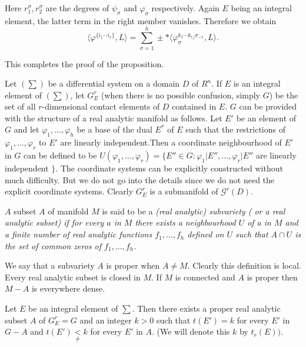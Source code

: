 Here $r^\sigma_1,  r^\sigma_2$ are the degrees of $\psi_\sigma$ and
$\varphi_\sigma$ respectively. Again $E$ being an integral element,  the
latter term in the right member vanishes. Therefore we obtain 
$$
\langle \varphi^{ \{i_1 \cdots i_r \}} ,  L \rangle = \sum^h_{\sigma =
  1} \pm * \langle \varphi_\sigma^{k_1 \cdots k_{r_2}\sigma_{-1}} ,  L
\rangle. 
$$

This completes the proof of the proposition.

Let $(\sum)$ be a differential system on a domain $D$ of $R^n$. If $E$
is an integral element of $(\sum)$,  let $G^r_E$ (when there is no
possible confusion,  simply $G$) be the set of all $r$-dimensional
contact elements of $D$ contained in $E$. $G$ can be provided with the
structure of a real analytic manifold as follows. Let $E'$ be an
element of $G$ and let $\varphi_1 ,  \ldots ,  \varphi_h$ be a base of
the dual $E^*$ of $E$ such that the restrictions of $\varphi_1 ,
\ldots ,  \varphi_r$ to $E'$ are linearly independent.\pageoriginale Then a
coordinate neighbourhood of $E'$ in $G$ can be defined to be $U
(\varphi_1 ,  \ldots ,  \varphi_r) = \{E'' \in G : \varphi_1 \big |
E'' ,  \ldots ,  \varphi_r \big | E'' $ are linearly independent $\}$.
The coordinate systems can be explicitly constructed without much
difficulty. But we do not go into the details since we do not need the
explicit coordinate systems. Clearly $G^r_E$ is a submanifold of
$\mathscr{G}^r (D)$. 

\begin{defi*} %
  $A$ subset $A$ of manifold $M$ is said to be a \em{ (real analytic)
    subvariety} ( or a \em {real analytic subset}) if for every $a$ in
  $M$ there exists a neighbourhood $U$ of a in $M$ and a finite number
  of real analytic functions $f_1 ,  \ldots ,  f_h$ defined on $U$
  such that $A \cap U$ is the set of common zeros of $f_1 ,  \ldots ,
  f_h$. 
\end{defi*}

We say that a subvariety $A$ is proper when $A \neq M$. Clearly this
definition is local. Every real analytic subset is closed in $M$. If
$M$ is connected and $A$ is proper then $M - A$ is everywhere dense. 

\begin{proposition}\label{chap2:sec2.3:prop6} %
  Let $E$ be an integral element of $\sum$. Then there exists a proper
  real analytic subset $A$ of $G^r_E = G$ and an integer $k > 0$ such
  that $t (E') = k$ for every $E'$ in $G - A$ and $t (E')
  \underset{\neq}{<} k$ for every $E'$ in $A$.  (We will denote this
  $k$ by $t_r(E))$. 
\end{proposition}

